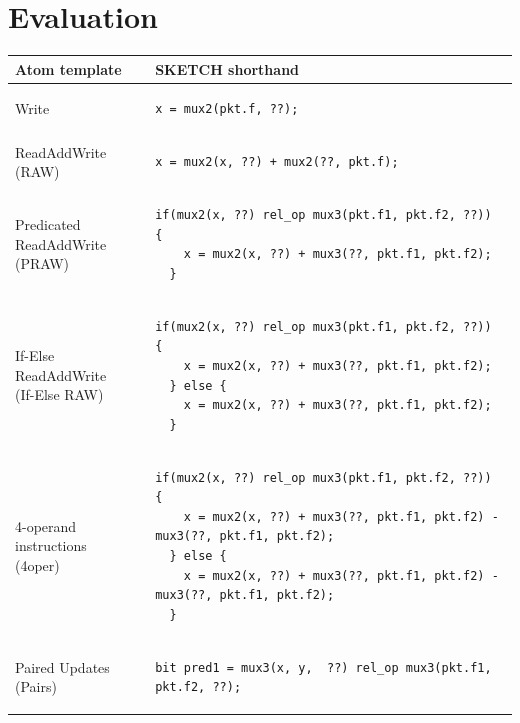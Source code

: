 \section{Evaluation}
\label{s:eval}
\begin{table}[!t]
  \begin{scriptsize}
  \begin{tabular}{|p{}|p{}|}
  \hline
  Atom template & SKETCH shorthand\\
  \hline
  Write &
  {\begin{lstlisting}[style=customctable]
  x = mux2(pkt.f, ??);
  \end{lstlisting}} \\
  \hline
  ReadAddWrite (RAW) &
  {\begin{lstlisting}[style=customctable]
  x = mux2(x, ??) + mux2(??, pkt.f);
  \end{lstlisting}} \\
  \hline
  \pbox{0.15\textwidth}
  {Predicated\\
  ReadAddWrite (PRAW)} &
  {\begin{lstlisting}[style=customctable]
  if(mux2(x, ??) rel_op mux3(pkt.f1, pkt.f2, ??)) {
    x = mux2(x, ??) + mux3(??, pkt.f1, pkt.f2);
  }
  \end{lstlisting}} \\
  \hline
  \pbox{0.15\textwidth}
  {If-Else\\
   ReadAddWrite\\
   (If-Else RAW)} &
  {\begin{lstlisting}[style=customctable]
  if(mux2(x, ??) rel_op mux3(pkt.f1, pkt.f2, ??)) {
    x = mux2(x, ??) + mux3(??, pkt.f1, pkt.f2);
  } else {
    x = mux2(x, ??) + mux3(??, pkt.f1, pkt.f2);
  }
  \end{lstlisting}} \\
  \hline
  \pbox{0.15\textwidth}
  {4-operand instructions\\
   (4oper)} &
  {\begin{lstlisting}[style=customctable]
  if(mux2(x, ??) rel_op mux3(pkt.f1, pkt.f2, ??)) {
    x = mux2(x, ??) + mux3(??, pkt.f1, pkt.f2) - mux3(??, pkt.f1, pkt.f2);
  } else { 
    x = mux2(x, ??) + mux3(??, pkt.f1, pkt.f2) - mux3(??, pkt.f1, pkt.f2);
  }
  \end{lstlisting}} \\
  \hline
  Paired Updates (Pairs) &
  {\begin{lstlisting}[style=customctable]
  bit pred1 = mux3(x, y,  ??) rel_op mux3(pkt.f1, pkt.f2, ??);

\end{lstlisting}}
\end{tabular}
\end{scriptsize}
\end{table}
